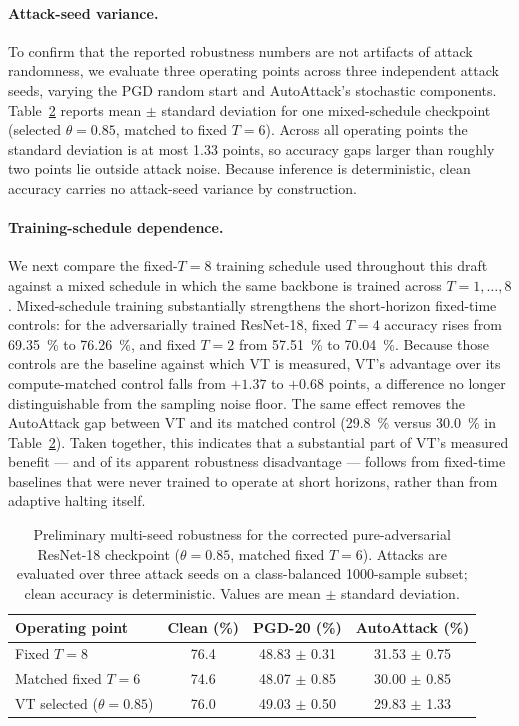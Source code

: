 \documentclass[11pt]{article}
\begin{document}
\begin{table}[t]
\paragraph{Attack-seed variance.} To confirm that the reported robustness numbers are not artifacts of attack randomness, we evaluate three operating points across three independent attack seeds, varying the PGD random start and AutoAttack's stochastic components. Table~\ref{tab:multiseed} reports mean $\pm$ standard deviation for one mixed-schedule checkpoint (selected $\theta = 0.85$, matched to fixed $T = 6$). Across all operating points the standard deviation is at most \num{1.33} points, so accuracy gaps larger than roughly two points lie outside attack noise. Because inference is deterministic, clean accuracy carries no attack-seed variance by construction.

\paragraph{Training-schedule dependence.} We next compare the fixed-$T=8$ training schedule used throughout this draft against a mixed schedule in which the same backbone is trained across $T=1,\dots,8$. Mixed-schedule training substantially strengthens the short-horizon fixed-time controls: for the adversarially trained ResNet-18, fixed $T=4$ accuracy rises from \SI{69.35}{\percent} to \SI{76.26}{\percent}, and fixed $T=2$ from \SI{57.51}{\percent} to \SI{70.04}{\percent}. Because those controls are the baseline against which VT is measured, VT's advantage over its compute-matched control falls from $+1.37$ to $+0.68$ points, a difference no longer distinguishable from the sampling noise floor. The same effect removes the AutoAttack gap between VT and its matched control (\SI{29.8}{\percent} versus \SI{30.0}{\percent} in Table~\ref{tab:multiseed}). Taken together, this indicates that a substantial part of VT's measured benefit --- and of its apparent robustness disadvantage --- follows from fixed-time baselines that were never trained to operate at short horizons, rather than from adaptive halting itself.

\begin{table}[t]
\centering
\caption{Preliminary multi-seed robustness for the corrected pure-adversarial ResNet-18 checkpoint ($\theta=0.85$, matched fixed $T=6$). Attacks are evaluated over three attack seeds on a class-balanced \num{1000}-sample subset; clean accuracy is deterministic. Values are mean $\pm$ standard deviation.}
\label{tab:multiseed}
\begin{tabular}{lccc}
\toprule
Operating point & Clean (\%) & PGD-20 (\%) & AutoAttack (\%) \\
\midrule
Fixed $T=8$ & 76.4 & 48.83 $\pm$ 0.31 & 31.53 $\pm$ 0.75 \\
Matched fixed $T=6$ & 74.6 & 48.07 $\pm$ 0.85 & 30.00 $\pm$ 0.85 \\
VT selected ($\theta=0.85$) & 76.0 & 49.03 $\pm$ 0.50 & 29.83 $\pm$ 1.33 \\
\bottomrule
\end{tabular}
\end{table}


\end{table}
\end{document}
